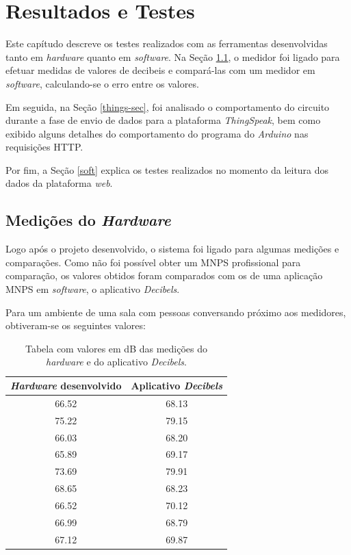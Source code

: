 \documentclass[
    12pt,               %
    openright,          %
    oneside,
    a4paper,            
    english,            %
    brazil              %
    ]{abntex2}
\begin{document}
\chapter{Resultados e Testes}\label{resultados}

Este capítudo descreve os testes realizados com as ferramentas desenvolvidas tanto em \textit{hardware} quanto em \textit{software}. Na Seção \ref{medicoes}, o medidor foi ligado para efetuar medidas de valores de decibeis e compará-las com um medidor em \textit{software}, calculando-se o erro entre os valores. 

Em seguida, na Seção \ref{things-sec}, foi analisado o comportamento do circuito durante a fase de envio de dados para a plataforma \textit{ThingSpeak}, bem como exibido alguns detalhes do comportamento do programa do \textit{Arduino} nas requisições HTTP. 

Por fim, a Seção \ref{soft} explica os testes realizados no momento da leitura dos dados da plataforma \textit{web}.

\section{Medições do \textit{Hardware}}\label{medicoes}

Logo após o projeto desenvolvido, o sistema foi ligado para algumas medições e comparações. Como não foi possível obter um MNPS profissional para comparação, os valores obtidos foram comparados com os de uma aplicação MNPS em \textit{software}, o aplicativo \textit{Decibels}.

Para um ambiente de uma sala com pessoas conversando próximo aos medidores, obtiveram-se os seguintes valores:

  \begin{table}[!htb]
    \caption{Tabela com valores em dB das medições do \textit{hardware} e do aplicativo \textit{Decibels}. }
    \label{tabela-db}
    \center
    \begin{tabular}{|c|c|}
      \hline
      \rowcolor[gray]{.9}
      \textbf{\textit{Hardware} desenvolvido} & \textbf{Aplicativo \textit{Decibels}}\\
      \hline
      \textsf{66.52} & \textsf{68.13}\\
      \hline
      \textsf{75.22} & \textsf{79.15}\\
      \hline
      \textsf{66.03} & \textsf{68.20}\\
      \hline
      \textsf{65.89} & \textsf{69.17}\\
      \hline
      \textsf{73.69} & \textsf{79.91}\\
      \hline
      \textsf{68.65} & \textsf{68.23}\\
      \hline
      \textsf{66.52} & \textsf{70.12}\\
      \hline
      \textsf{66.99} & \textsf{68.79}\\
      \hline
      \textsf{67.12} & \textsf{69.87}\\
      \hline
    \end{tabular}
  \end{table} 
\end{document}
